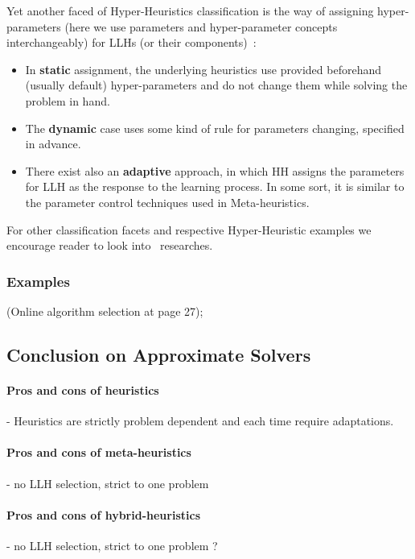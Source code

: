 Yet another faced of Hyper-Heuristics classification is the way of assigning hyper-parameters (here we use parameters and hyper-parameter concepts interchangeably) for LLHs (or their components)~\cite{drake2019recent}:
\begin{itemize}
	\item In \textbf{static} assignment, the underlying heuristics use provided beforehand (usually default) hyper-parameters and do not change them while solving the problem in hand.

	\item The \textbf{dynamic} case uses some kind of rule for parameters changing, specified in advance.

	\item There exist also an \textbf{adaptive} approach, in which HH assigns the parameters for LLH as the response to the learning process. In some sort, it is similar to the parameter control techniques used in Meta-heuristics.
\end{itemize}


For other classification facets and respective Hyper-Heuristic examples we encourage reader to look into~\cite{burke2003hyper,ryser2014review,drake2019recent,burke2019classification,kerschke2019automated} researches.

\subsubsection{Examples}\label{bg: hh examples}%
\cite{drake2019recent} (Online algorithm selection at page 27); \cite{kerschke2019automated}

\subsection{Conclusion on Approximate Solvers}
\paragraph{Pros and cons of heuristics} - Heuristics are strictly problem dependent and each time require adaptations.
\paragraph{Pros and cons of meta-heuristics} - no LLH selection, strict to one problem
\paragraph{Pros and cons of hybrid-heuristics} - no LLH selection, strict to one problem ? 

